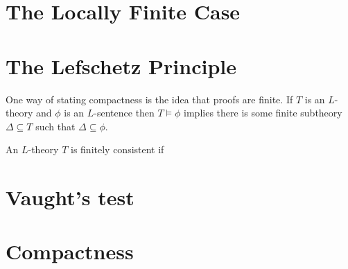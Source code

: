 \documentclass{article}
\newcommand{\subs}{\subseteq}
\newcommand{\De}{\Delta}
\newcommand{\<}{\langle}
\renewcommand{\>}{\rangle}
\newcommand{\link}[1]{\hypertarget{#1}{}}
\theoremstyle{definitionstyle}
\theoremstyle{exercisestyle}
\theoremstyle{remarkstyle}
\begin{document}


\section{The Locally Finite Case}



\section{The Lefschetz Principle}



One way of stating compactness is the idea that proofs are finite.
If $T$ is an $L$-theory and $\phi$ is an $L$-sentence
then $T \vDash \phi$ implies there is some finite subtheory $\De \subs T$
such that $\De \subs \phi$.

\begin{dfn}
  An $L$-theory $T$ is finitely consistent if
\end{dfn}


\section{Vaught's test}
\link{vaught_proof}

\section{Compactness}

{}

\end{document}
